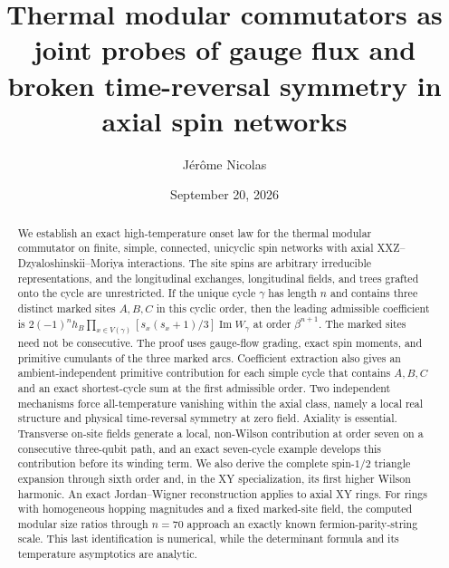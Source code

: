 \documentclass[aps,prb,preprint,nofootinbib,longbibliography]{revtex4-2}
\begin{document}
\title{Thermal modular commutators as joint probes of gauge flux and broken
time-reversal symmetry in axial spin networks}

\author{J\'er\^ome Nicolas}

\date{September 20, 2026}

\begin{abstract}
We establish an exact high-temperature onset law for the thermal modular
commutator on finite, simple, connected, unicyclic spin networks with axial
XXZ--Dzyaloshinskii--Moriya interactions.  The site spins are arbitrary
irreducible representations, and the longitudinal exchanges, longitudinal
fields, and trees grafted onto the cycle are unrestricted.  If the unique
cycle $\gamma$ has length $n$ and contains three distinct marked sites
$A,B,C$ in this cyclic order, then the leading admissible coefficient is
$2(-1)^n h_B\prod_{x\in V(\gamma)}[s_x(s_x+1)/3]
\operatorname{Im}W_\gamma$
at order $\beta^{n+1}$.  The marked sites need not be consecutive.  The proof
uses gauge-flow grading, exact spin moments, and primitive cumulants of the
three marked arcs.  Coefficient extraction also gives an ambient-independent
primitive contribution for each simple cycle that contains $A,B,C$ and an
exact shortest-cycle sum at the first admissible order.  Two independent
mechanisms force all-temperature vanishing within the axial class, namely a
local real structure and physical time-reversal symmetry at zero field.
Axiality is essential.  Transverse on-site fields generate a local,
non-Wilson contribution at order seven on a consecutive three-qubit path,
and an exact seven-cycle example develops this contribution before its
winding term.  We also derive the complete spin-$1/2$ triangle expansion
through sixth order and, in the XY specialization, its first higher Wilson
harmonic.  An exact Jordan--Wigner reconstruction applies to axial XY rings.
For rings with homogeneous hopping magnitudes and a fixed marked-site field,
the computed modular size ratios through $n=70$ approach an exactly known
fermion-parity-string scale.  This last identification is numerical, while
the determinant formula and its temperature asymptotics are analytic.
\end{abstract}

\maketitle
\end{document}
